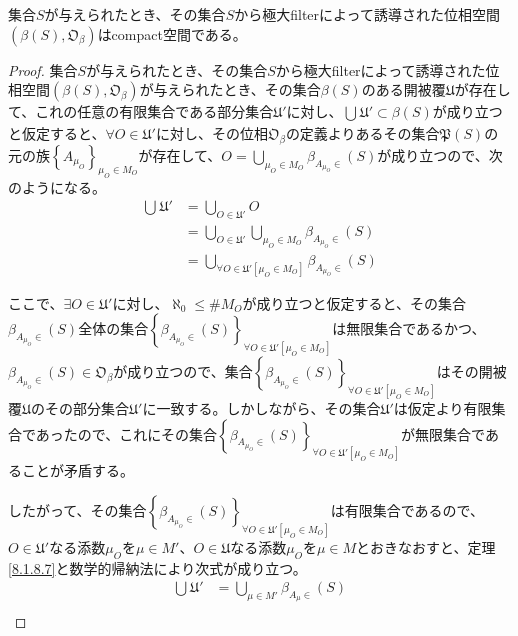 \documentclass[dvipdfmx]{jsarticle}
\begin{document}
\begin{thm}\label{8.1.8.12}
集合$S$が与えられたとき、その集合$S$から極大filterによって誘導された位相空間$\left( \beta(S),\mathfrak{O}_{\beta} \right)$はcompact空間である。
\end{thm}
\begin{proof}
集合$S$が与えられたとき、その集合$S$から極大filterによって誘導された位相空間$\left( \beta(S),\mathfrak{O}_{\beta} \right)$が与えられたとき、その集合$\beta(S)$のある開被覆$\mathfrak{U}$が存在して、これの任意の有限集合である部分集合$\mathfrak{U}'$に対し、$\bigcup_{} \mathfrak{U}' \subset \beta(S)$が成り立つと仮定すると、$\forall O \in \mathfrak{U}'$に対し、その位相$\mathfrak{O}_{\beta}$の定義よりあるその集合$\mathfrak{P}(S)$の元の族$\left\{ A_{\mu_{O}} \right\}_{\mu_{O} \in M_{O} }$が存在して、$O = \bigcup_{\mu_{O} \in M_{O}} {\beta_{A_{\mu_{O}} \in}(S)}$が成り立つので、次のようになる。
\begin{align*}
\bigcup_{} \mathfrak{U}' &= \bigcup_{O \in \mathfrak{U}'} O\\
&= \bigcup_{O \in \mathfrak{U}'} {\bigcup_{\mu_{O} \in M_{O}} {\beta_{A_{\mu_{O}} \in}(S)}}\\
&= \bigcup_{\forall O \in \mathfrak{U}'\left[ \mu_{O} \in M_{O} \right]} {\beta_{A_{\mu_{O}} \in}(S)}
\end{align*}\par
ここで、$\exists O \in \mathfrak{U}'$に対し、$\aleph_{0} \leq {\#}M_{O}$が成り立つと仮定すると、その集合$\beta_{A_{\mu_{O}} \in}(S)$全体の集合$\left\{ \beta_{A_{\mu_{O}} \in}(S) \right\}_{\forall O \in \mathfrak{U}'\left[ \mu_{O} \in M_{O} \right]}$は無限集合であるかつ、$\beta_{A_{\mu_{O}} \in}(S) \in \mathfrak{O}_{\beta}$が成り立つので、集合$\left\{ \beta_{A_{\mu_{O}} \in}(S) \right\}_{\forall O \in \mathfrak{U}'\left[ \mu_{O} \in M_{O} \right]}$はその開被覆$\mathfrak{U}$のその部分集合$\mathfrak{U}'$に一致する。しかしながら、その集合$\mathfrak{U}'$は仮定より有限集合であったので、これにその集合$\left\{ \beta_{A_{\mu_{O}} \in}(S) \right\}_{\forall O \in \mathfrak{U}'\left[ \mu_{O} \in M_{O} \right]}$が無限集合であることが矛盾する。\par
したがって、その集合$\left\{ \beta_{A_{\mu_{O}} \in}(S) \right\}_{\forall O \in \mathfrak{U}'\left[ \mu_{O} \in M_{O} \right]}$は有限集合であるので、$O \in \mathfrak{U}'$なる添数$\mu_{O}$を$\mu \in M'$、$O \in \mathfrak{U}$なる添数$\mu_{O}$を$\mu \in M$とおきなおすと、定理\ref{8.1.8.7}と数学的帰納法により次式が成り立つ。
\begin{align*}
\bigcup_{} \mathfrak{U}' &= \bigcup_{\mu \in M'} {\beta_{A_{\mu} \in}(S)}\\

\end{align*}
\end{proof}
\end{document}
